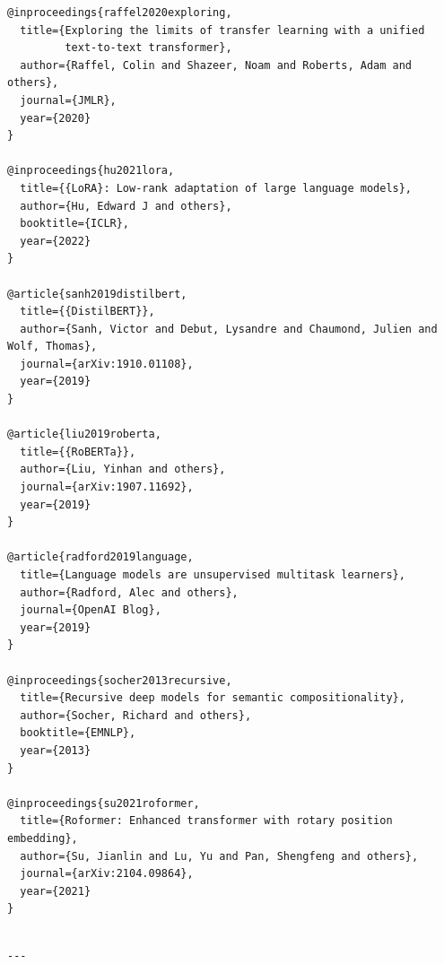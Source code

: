 \begin{lstlisting}
@inproceedings{raffel2020exploring,
  title={Exploring the limits of transfer learning with a unified 
         text-to-text transformer},
  author={Raffel, Colin and Shazeer, Noam and Roberts, Adam and others},
  journal={JMLR},
  year={2020}
}

@inproceedings{hu2021lora,
  title={{LoRA}: Low-rank adaptation of large language models},
  author={Hu, Edward J and others},
  booktitle={ICLR},
  year={2022}
}

@article{sanh2019distilbert,
  title={{DistilBERT}},
  author={Sanh, Victor and Debut, Lysandre and Chaumond, Julien and Wolf, Thomas},
  journal={arXiv:1910.01108},
  year={2019}
}

@article{liu2019roberta,
  title={{RoBERTa}},
  author={Liu, Yinhan and others},
  journal={arXiv:1907.11692},
  year={2019}
}

@article{radford2019language,
  title={Language models are unsupervised multitask learners},
  author={Radford, Alec and others},
  journal={OpenAI Blog},
  year={2019}
}

@inproceedings{socher2013recursive,
  title={Recursive deep models for semantic compositionality},
  author={Socher, Richard and others},
  booktitle={EMNLP},
  year={2013}
}

@inproceedings{su2021roformer,
  title={Roformer: Enhanced transformer with rotary position embedding},
  author={Su, Jianlin and Lu, Yu and Pan, Shengfeng and others},
  journal={arXiv:2104.09864},
  year={2021}
}
\end{lstlisting}
\begin{lstlisting}

---
\end{lstlisting}
